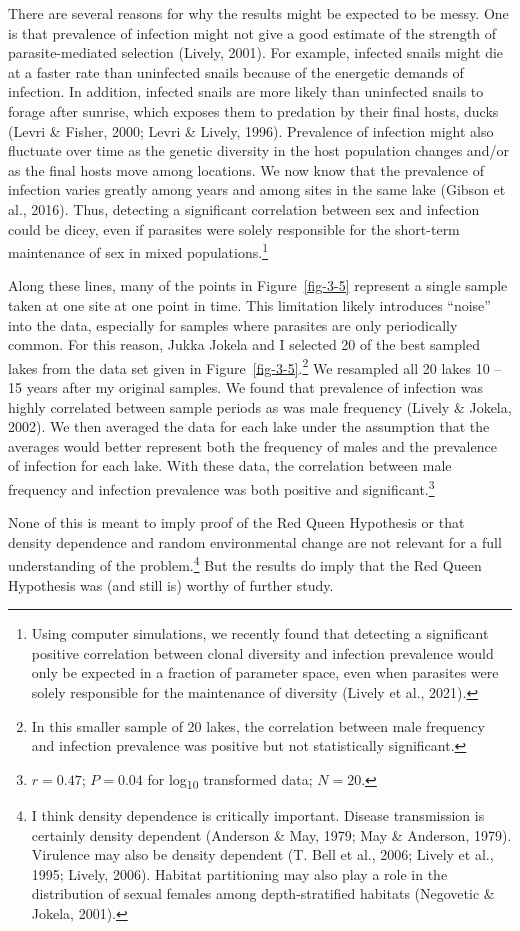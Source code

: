\documentclass[
  letterpaper,
]{book}
\begin{document}
There are several reasons for why the results might be expected to be
messy. One is that prevalence of infection might not give a good
estimate of the strength of parasite-mediated selection (Lively, 2001).
For example, infected snails might die at a faster rate than uninfected
snails because of the energetic demands of infection. In addition,
infected snails are more likely than uninfected snails to forage after
sunrise, which exposes them to predation by their final hosts, ducks
(Levri \& Fisher, 2000; Levri \& Lively, 1996). Prevalence of infection
might also fluctuate over time as the genetic diversity in the host
population changes and/or as the final hosts move among locations. We
now know that the prevalence of infection varies greatly among years and
among sites in the same lake (Gibson et al., 2016). Thus, detecting a
significant correlation between sex and infection could be dicey, even
if parasites were solely responsible for the short-term maintenance of
sex in mixed populations.\footnote{Using computer simulations, we
  recently found that detecting a significant positive correlation
  between clonal diversity and infection prevalence would only be
  expected in a fraction of parameter space, even when parasites were
  solely responsible for the maintenance of diversity (Lively et al.,
  2021).}

Along these lines, many of the points in Figure~\ref{fig-3-5} represent
a single sample taken at one site at one point in time. This limitation
likely introduces ``noise'' into the data, especially for samples where
parasites are only periodically common. For this reason, Jukka Jokela
and I selected 20 of the best sampled lakes from the data set given in
Figure~\ref{fig-3-5}.\footnote{In this smaller sample of 20 lakes, the
  correlation between male frequency and infection prevalence was
  positive but not statistically significant.} We resampled all 20 lakes
10 -- 15 years after my original samples. We found that prevalence of
infection was highly correlated between sample periods as was male
frequency (Lively \& Jokela, 2002). We then averaged the data for each
lake under the assumption that the averages would better represent both
the frequency of males and the prevalence of infection for each lake.
With these data, the correlation between male frequency and infection
prevalence was both positive and significant.\footnote{\(r = 0.47\);
  \(P = 0.04\) for log\textsubscript{10} transformed data; \(N = 20\).}

None of this is meant to imply proof of the Red Queen Hypothesis or that
density dependence and random environmental change are not relevant for
a full understanding of the problem.\footnote{I think density dependence
  is critically important. Disease transmission is certainly density
  dependent (Anderson \& May, 1979; May \& Anderson, 1979). Virulence
  may also be density dependent (T. Bell et al., 2006; Lively et al.,
  1995; Lively, 2006). Habitat partitioning may also play a role in the
  distribution of sexual females among depth-stratified habitats
  (Negovetic \& Jokela, 2001).} But the results do imply that the Red
Queen Hypothesis was (and still is) worthy of further study.
\end{document}
